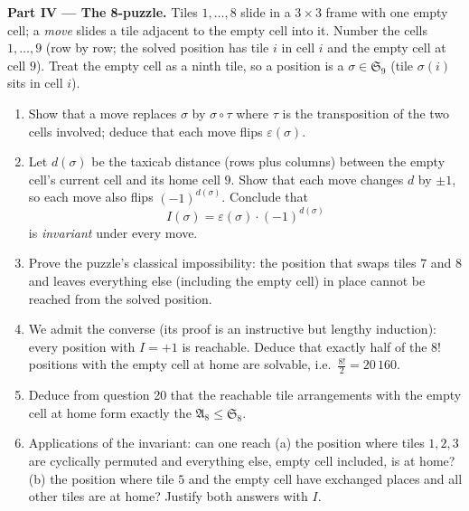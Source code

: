 \begin{problem}
\medskip
\noindent\textbf{Part IV --- The 8-puzzle.} Tiles $1, \dots, 8$
slide in a $3 \times 3$ frame with one empty cell; a \emph{move}
slides a tile adjacent to the empty cell into it. Number the cells
$1, \dots, 9$ (row by row; the solved position has tile $i$ in
cell $i$ and the empty cell at cell $9$). Treat the empty cell as
a ninth tile, so a position is a  $\sigma \in \mathfrak
S_9$ (tile $\sigma(i)$ sits in cell $i$).
\begin{enumerate}[resume]
  \item Show that a move replaces $\sigma$ by $\sigma \circ \tau$
        where $\tau$ is the transposition of the two cells
        involved; deduce that each move flips
        $\varepsilon(\sigma)$.
  \item Let $d(\sigma)$ be the taxicab distance (rows plus
        columns) between the empty cell's current cell and its
        home cell $9$. Show that each move changes $d$ by $\pm1$,
        so each move also flips $(-1)^{d(\sigma)}$. Conclude that
        \[
        I(\sigma) = \varepsilon(\sigma)\cdot(-1)^{d(\sigma)}
        \]
        is \emph{invariant} under every move.
  \item Prove the puzzle's classical impossibility: the position
        that swaps tiles $7$ and $8$ and leaves everything else
        (including the empty cell) in place cannot be reached
        from the solved position.
  \item We admit the converse (its proof is an instructive but
        lengthy induction): every position with $I = +1$ is
        reachable. Deduce that exactly half of the $8!$ positions
        with the empty cell at home are solvable, i.e.\
        $\frac{8!}2 = 20\,160$.
  \item Deduce from question 20 that the reachable tile
        arrangements with the empty cell at home form exactly the
        \omterm{def:b1:structures:subgroup}{subgroup} $\mathfrak A_8 \leq \mathfrak S_8$.
  \item Applications of the invariant: can one reach (a) the
        position where tiles $1, 2, 3$ are cyclically permuted
        and everything else, empty cell included, is at home?
        (b) the position where tile $5$ and the empty cell have
        exchanged places and all other tiles are at home? Justify
        both answers with $I$.
\end{enumerate}


\end{problem}
